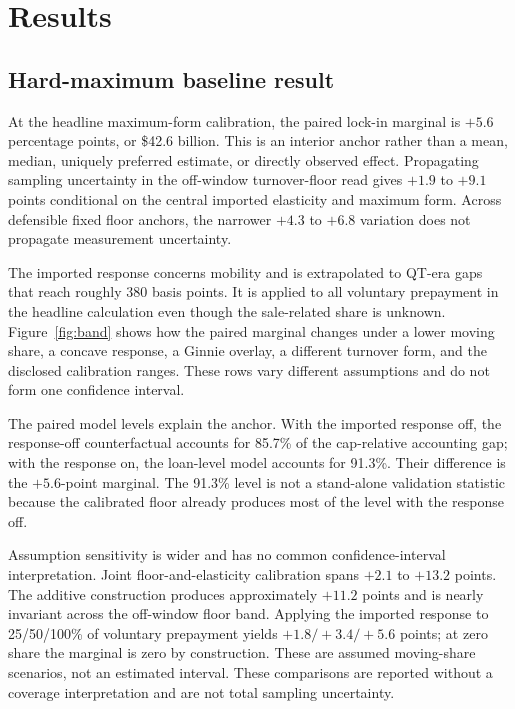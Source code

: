 \section{Results}\label{sec:results}\label{sec:identification}\label{sec:hazard-interp}

\subsection{Hard-maximum baseline result}

At the headline maximum-form calibration, the paired lock-in marginal is $+5.6$ percentage points, or \$42.6 billion. This is an interior anchor rather than a mean, median, uniquely preferred estimate, or directly observed effect. Propagating sampling uncertainty in the off-window turnover-floor read gives $+1.9$ to $+9.1$ points conditional on the central imported elasticity and maximum form. Across defensible fixed floor anchors, the narrower $+4.3$ to $+6.8$ variation does not propagate measurement uncertainty.

The imported response concerns mobility and is extrapolated to QT-era gaps that reach roughly 380 basis points. It is applied to all voluntary prepayment in the headline calculation even though the sale-related share is unknown. Figure~\ref{fig:band} shows how the paired marginal changes under a lower moving share, a concave response, a Ginnie overlay, a different turnover form, and the disclosed calibration ranges. These rows vary different assumptions and do not form one confidence interval.

The paired model levels explain the anchor. With the imported response off, the response-off counterfactual accounts for 85.7\% of the cap-relative accounting gap; with the response on, the loan-level model accounts for 91.3\%. Their difference is the $+5.6$-point marginal. The 91.3\% level is not a stand-alone validation statistic because the calibrated floor already produces most of the level with the response off.

Assumption sensitivity is wider and has no common confidence-interval interpretation. Joint floor-and-elasticity calibration spans $+2.1$ to $+13.2$ points. The additive construction produces approximately $+11.2$ points and is nearly invariant across the off-window floor band. Applying the imported response to 25/50/100\% of voluntary prepayment yields $+1.8/+3.4/+5.6$ points; at zero share the marginal is zero by construction. These are assumed moving-share scenarios, not an estimated interval. These comparisons are reported without a coverage interpretation and are not total sampling uncertainty.

